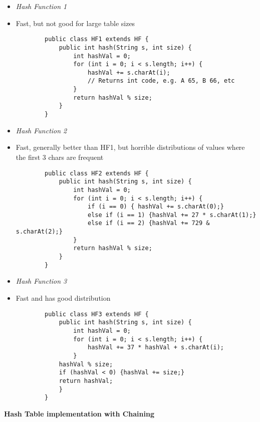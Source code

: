 \documentclass[10pt, 
a4paper, 
oneside, 
headinclude, footinclude, 
BCOR5mm]
{scrartcl}
\begin{document}
\begin{itemize}
    \item \textit{Hash Function 1}
    \item Fast, but not good for large table sizes
    \begin{lstlisting}
        public class HF1 extends HF {
            public int hash(String s, int size) {
                int hashVal = 0;
                for (int i = 0; i < s.length; i++) {
                    hashVal += s.charAt(i);
                    // Returns int code, e.g. A 65, B 66, etc
                }
                return hashVal % size;
            }
        }
    \end{lstlisting}
    \newpage
    \item \textit{Hash Function 2}
    \item Fast, generally better than HF1, but horrible distributions of values where the first 3 chars are frequent
    \begin{lstlisting}
        public class HF2 extends HF {
            public int hash(String s, int size) {
                int hashVal = 0;
                for (int i = 0; i < s.length; i++) {
                    if (i == 0) { hashVal += s.charAt(0);}
                    else if (i == 1) {hashVal += 27 * s.charAt(1);}
                    else if (i == 2) {hashVal += 729 & s.charAt(2);}
                }
                return hashVal % size;
            }
        }
    \end{lstlisting}
    \item \textit{Hash Function 3}
    \item Fast and has good distribution
    \begin{lstlisting}
        public class HF3 extends HF {
            public int hash(String s, int size) {
                int hashVal = 0;
                for (int i = 0; i < s.length; i++) {
                    hashVal += 37 * hashVal + s.charAt(i);
                }
            hashVal % size;
            if (hashVal < 0) {hashVal += size;}
            return hashVal;
            }
        }
    \end{lstlisting}
\end{itemize}
\textbf{Hash Table implementation with Chaining}
\end{document}
